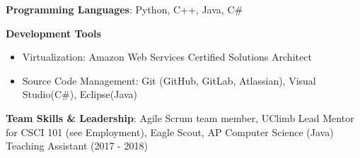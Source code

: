 \vspace{-2.0mm}


\begin{cventries}
\vspace{-5mm}
  \cventry
    {}
    {}
    {}
    {}
    {
      \begin{cvitems}
        \item {\textbf{Programming Languages}: Python, C++, Java, C\#}
        \item {\textbf{Development Tools}}
        \begin{itemize}
        \item {Virtualization: Amazon Web Services
            Certified Solutions Architect}
        \item {Source Code Management: Git (GitHub, GitLab, Atlassian),
            Visual Studio(C\#), Eclipse(Java)}
        \end {itemize}
        \item {\textbf{Team Skills \& Leadership}: Agile Scrum team
            member, UClimb Lead Mentor for CSCI 101 (see Employment),
    Eagle Scout, AP Computer Science (Java) Teaching Assistant (2017 -
    2018)}
      \end{cvitems}
    }
\end{cventries}
